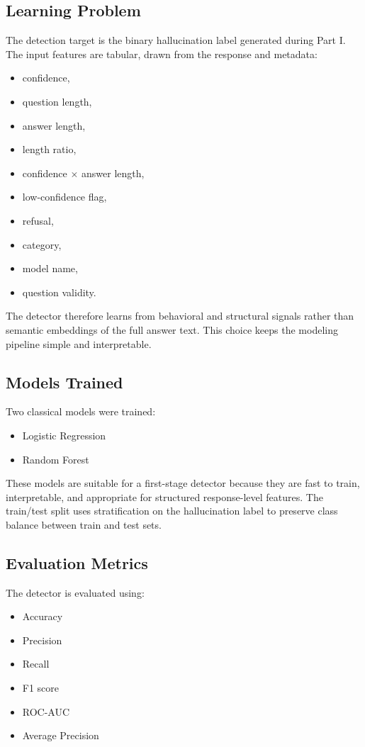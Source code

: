 \documentclass[11pt]{article}
\begin{document}
\subsection{Learning Problem}
The detection target is the binary hallucination label generated during Part I. The input features are tabular, drawn from the response and metadata:
\begin{itemize}[leftmargin=1.5em]
    \item confidence,
    \item question length,
    \item answer length,
    \item length ratio,
    \item confidence $\times$ answer length,
    \item low-confidence flag,
    \item refusal,
    \item category,
    \item model name,
    \item question validity.
\end{itemize}

The detector therefore learns from behavioral and structural signals rather than semantic embeddings of the full answer text. This choice keeps the modeling pipeline simple and interpretable.

\subsection{Models Trained}
Two classical models were trained:
\begin{itemize}[leftmargin=1.5em]
    \item Logistic Regression
    \item Random Forest
\end{itemize}

These models are suitable for a first-stage detector because they are fast to train, interpretable, and appropriate for structured response-level features. The train/test split uses stratification on the hallucination label to preserve class balance between train and test sets.

\subsection{Evaluation Metrics}
The detector is evaluated using:
\begin{itemize}[leftmargin=1.5em]
    \item Accuracy
    \item Precision
    \item Recall
    \item F1 score
    \item ROC-AUC
    \item Average Precision
\end{itemize}
\end{document}
